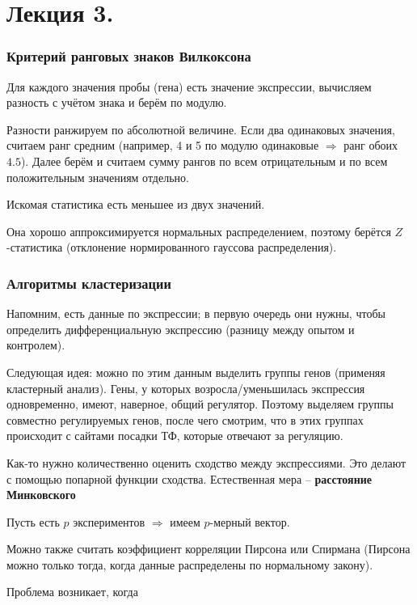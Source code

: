 \documentclass[main.tex]{subfiles}
\begin{document}
\section{Лекция 3. }

\subsubsection{Критерий ранговых знаков Вилкоксона}

Для каждого значения пробы (гена) есть значение экспрессии, вычисляем разность с учётом знака и берём по модулю.

Разности ранжируем по абсолютной величине.
Если два одинаковых значения, считаем ранг средним (например, 4 и 5 по модулю одинаковые $ \Rightarrow $ ранг обоих $ 4.5 $).
Далее берём и считаем сумму рангов по всем отрицательным и по всем положительным значениям отдельно.

Искомая статистика есть меньшее из двух значений. %

Она хорошо аппроксимируется нормальных распределением, поэтому берётся $ Z $-статистика (отклонение нормированного гауссова распределения).

\subsubsection{Алгоритмы кластеризации}

Напомним, есть данные по экспрессии; в первую очередь они нужны, чтобы определить дифференциальную экспрессию (разницу между опытом и контролем).

Следующая идея: можно по этим данным выделить группы генов (применяя кластерный анализ).
Гены, у которых возросла/уменьшилась экспрессия одновременно, имеют, наверное, общий регулятор.
Поэтому выделяем группы совместно регулируемых генов, после чего смотрим, что в этих группах происходит с сайтами посадки ТФ, которые отвечают за регуляцию.

Как-то нужно количественно оценить сходство между экспрессиями.
Это делают с помощью попарной функции сходства.
Естественная мера -- \textbf{расстояние Минковского}

Пусть есть $ p $ экспериментов $ \Rightarrow $ имеем $ p $-мерный вектор.

Можно также считать коэффициент корреляции Пирсона или Спирмана (Пирсона можно только тогда, когда данные распределены по нормальному закону).

Проблема возникает, когда %
\end{document}
